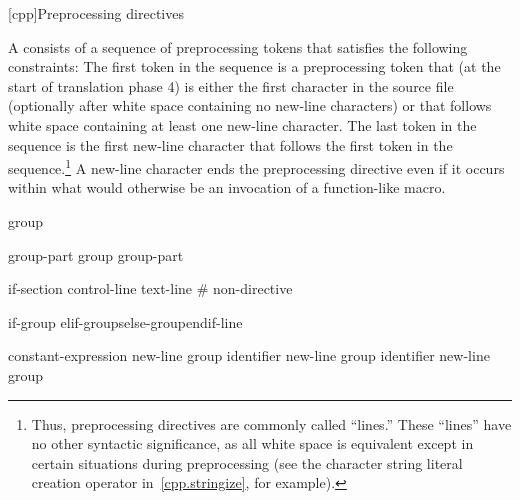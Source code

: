 [cpp]{Preprocessing directives}%

%
%


\pnum
A  consists of a sequence of preprocessing tokens
that satisfies the following constraints:
The first token in the sequence is a
\tcode{\#}
preprocessing token that (at the start of translation phase 4)
is either the first character in the source file
(optionally after white space containing no new-line characters)
or that follows white space containing at least one new-line character.
The last token in the sequence is the first new-line character
that follows the first token in the sequence.\footnote{Thus,
preprocessing directives are commonly called ``lines.''
These ``lines'' have no other syntactic significance,
as all white space is equivalent except in certain situations
during preprocessing (see the
\tcode{\#}
character string literal creation operator in~\ref{cpp.stringize}, for example).}
A new-line character ends the preprocessing directive even if it occurs
within what would otherwise be an invocation of a function-like macro.

\begin{bnf}
\br
    group\opt
\end{bnf}

\begin{bnf}
\br
    group-part\br
    group group-part
\end{bnf}

\begin{bnf}
\br
    if-section\br
    control-line\br
    text-line\br
    \# non-directive
\end{bnf}

\begin{bnf}
\br
    if-group elif-groups\opt else-group\opt endif-line
\end{bnf}

\begin{bnftab}
\br
\>\>\>constant-expression new-line group\opt\br
\>\>\>identifier new-line group\opt\br
\>\>\>identifier new-line group\opt
\end{bnftab}

